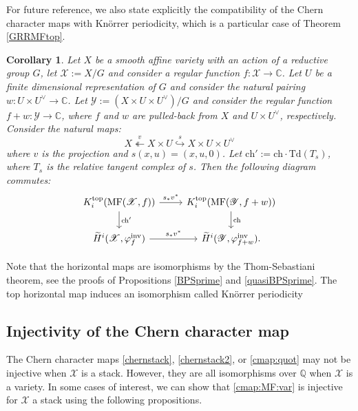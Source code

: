 \documentclass [11pt,oneside,a4paper,mathscr]{amsart}
\newtheorem{cor}[thm]{Corollary}
\theoremstyle{definition}
\newcommand{\X}{\mathscr{X}}
\begin{document}
For future reference, we also state explicitly the compatibility of the Chern character maps with Kn\"orrer periodicity, which is a particular case of Theorem \ref{GRRMFtop}.

\begin{cor}\label{corollary410}
    Let $X$ be a smooth affine variety with an action of a reductive group $G$, let $\X:=X/G$ and consider a regular function $f\colon\X\to\mathbb{C}$. 
    Let $U$ be a finite dimensional representation of $G$ and consider the natural pairing $w\colon U\times U^\vee\to\mathbb{C}$. Let $\mathscr{Y}:=(X\times U\times U^\vee)/G$ and consider the regular function $f+w\colon\mathscr{Y}\to\mathbb{C}$, where $f$ and $w$ are pulled-back from $X$ and $U\times U^\vee$, respectively. Consider the natural maps:
    \[X \stackrel{v}{\twoheadleftarrow} X\times U \stackrel{s}{\hookrightarrow} X\times U\times U^\vee\]
    where $v$ is the projection and $s(x, u)=(x, u, 0)$. 
    Let $\mathrm{ch}':=\mathrm{ch}\cdot \mathrm{Td}(T_s)$, where $T_s$ is the relative tangent complex of $s$.
    Then the following diagram commutes:
    \begin{equation*}
        \begin{tikzcd}
            K^{\mathrm{top}}_i(\mathrm{MF}(\X, f))\arrow[d, "\mathrm{ch}'"]\arrow[r, "s_*v^*"]& K^{\mathrm{top}}_i(\mathrm{MF}(\mathscr{Y}, f+w))\arrow[d, "\mathrm{ch}"]\\
            \widetilde{H}^i(\X, \varphi_f^{\rm{inv}})\arrow[r, "s_*v^*"]& \widetilde{H}^i(\mathscr{Y}, \varphi_{f+w}^{\rm{inv}}).
        \end{tikzcd}
    \end{equation*}
\end{cor}


    Note that the horizontal maps are isomorphisms by the Thom-Sebastiani theorem, see the proofs of Propositions \ref{BPSprime} and \ref{quasiBPSprime}. The top horizontal map induces an isomorphism called Kn\"orrer periodicity \cite{OrLG, Hirano} 


\subsection{Injectivity of the Chern character map}

The Chern character maps \eqref{chernstack}, \eqref{chernstack2}, or \eqref{cmap:quot} may not be injective when $\X$ is a stack. However, they are all isomorphisms over $\mathbb{Q}$ 
when $\X$ is a variety. 
In some cases of interest, we can show that \eqref{cmap:MF:var} is injective for $\X$ a stack using the following propositions.
\end{document}
